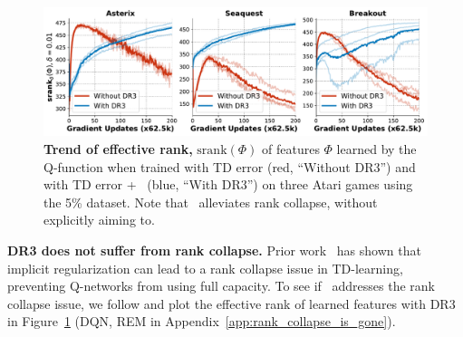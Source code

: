 \begin{figure}[h]
    \centering
    \vspace{-0.1in}
    \includegraphics[width=0.8\linewidth]{figures/rank_trends_dr3_dqn.pdf}
    \vspace{-0.1in}
    \caption{\footnotesize{{\textbf{Trend of effective rank,} $\mathrm{srank}(\Phi)$ of features $\Phi$ learned by the Q-function when trained with TD error (red, ``Without DR3'') and with TD error + \methodname\ (blue, ``With DR3'') on three Atari games using the 5\% dataset. Note that \methodname\ alleviates rank collapse, without explicitly aiming to.}}}
    \label{fig:iup_is_fixed}
    \vspace{-0.1in}
\end{figure}
\textbf{{{DR3 does not suffer from rank collapse.}}} Prior work~\citep{kumar2021implicit} has shown that implicit regularization can lead to a rank collapse issue in TD-learning, preventing Q-networks from using full capacity. To see if \methodname\ addresses the rank collapse issue, we follow \citet{kumar2021implicit} and plot the effective rank of learned features with DR3 in Figure~\ref{fig:iup_is_fixed} {(DQN, REM in Appendix~\ref{app:rank_collapse_is_gone})}. 
